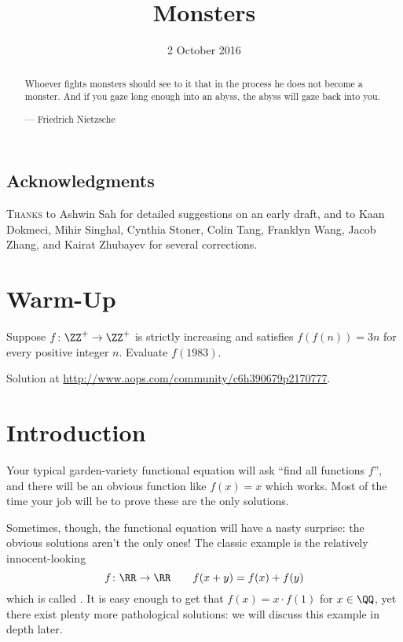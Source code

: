 \documentclass[11pt]{scrartcl}
\begin{document}
\title{Monsters}
\date{2 October 2016}
\maketitle
\begin{abstract}
  \sffamily\small
  Whoever fights monsters should see to it that in the process
  he does not become a monster.
  And if you gaze long enough into an abyss,
  the abyss will gaze back into you.

  \medskip

  --- Friedrich Nietzsche
\end{abstract}

\subsection*{Acknowledgments}
\textsc{Thanks} to Ashwin Sah for detailed suggestions on an early draft,
and to Kaan Dokmeci, Mihir Singhal, Cynthia Stoner, Colin Tang, Franklyn Wang,
Jacob Zhang, and Kairat Zhubayev for several corrections.

\section{Warm-Up}
\begin{problem}
  Suppose $f \colon \ZZ^+ \to \ZZ^+$ is strictly increasing and
  satisfies $f(f(n)) = 3n$ for every positive integer $n$.
  Evaluate $f(1983)$.
\end{problem}
\noindent Solution at \url{http://www.aops.com/community/c6h390679p2170777}.

\section{Introduction}
Your typical garden-variety functional equation will ask ``find all functions $f$'',
and there will be an obvious function like $f(x) = x$ which works.
Most of the time your job will be to prove these are the only solutions.

Sometimes, though, the functional equation will have a nasty surprise: the obvious solutions
aren't the only ones! The classic example is the relatively
innocent-looking \[ f \colon \RR \to \RR \qquad f(x+y) = f(x)+f(y) \]
which is called .
It is easy enough to get that $f(x) = x \cdot f(1)$ for $x \in \QQ$,
yet there exist plenty more pathological solutions:
we will discuss this example in depth later.
\end{document}
